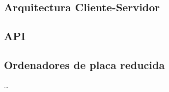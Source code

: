 \subsection{Arquitectura Cliente-Servidor}

\subsection{API}

\subsection{Ordenadores de placa reducida}

 \ldots 

 




